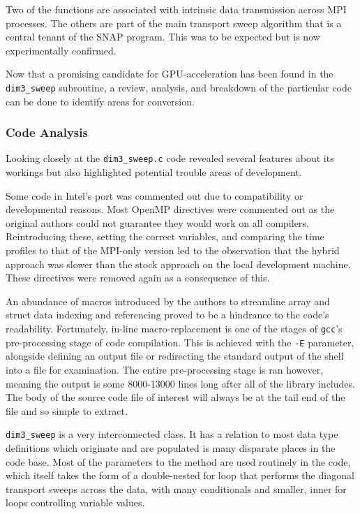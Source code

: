\documentclass[conference]{IEEEtran}
\begin{document}
Two of the functions are associated with intrinsic data transmission across MPI processes. The others are part of the main transport sweep algorithm that is a central tenant of the SNAP program. This was to be expected but is now experimentally confirmed.

Now that a promising candidate for GPU-acceleration has been found in the \texttt{dim3\_sweep} subroutine, a review, analysis, and breakdown of the particular code can be done to identify areas for conversion.


\subsubsection{Code Analysis}
\label{subsec:inv_codeanalysis}

Looking closely at the \texttt{dim3\_sweep.c} code revealed several features about its workings but also highlighted potential trouble areas of development.

Some code in Intel's port was commented out due to compatibility or developmental reasons. Most OpenMP directives were commented out as the original authors could not guarantee they would work on all compilers. Reintroducing these, setting the correct variables, and comparing the time profiles to that of the MPI-only version led to the observation that the hybrid approach was slower than the stock approach on the local development machine. These directives were removed again as a consequence of this.

An abundance of macros introduced by the authors to streamline array and struct data indexing and referencing proved to be a hindrance to the code's readability. Fortunately, in-line macro-replacement is one of the stages of \texttt{gcc}'s pre-processing stage of code compilation. This is achieved with the \texttt{-E} parameter, alongside defining an output file or redirecting the standard output of the shell into a file for examination. The entire pre-processing stage is ran however, meaning the output is some 8000-13000 lines long after all of the library includes. The body of the source code file of interest will always be at the tail end of the file and so simple to extract.

\texttt{dim3\_sweep} is a very interconnected class. It has a relation to most data type definitions which originate and are populated is many disparate places in the code base. Most of the parameters to the method are used routinely in the code, which itself takes the form of a double-nested for loop that performs the diagonal transport sweeps across the data, with many conditionals and smaller, inner for loops controlling variable values.
\end{document}
